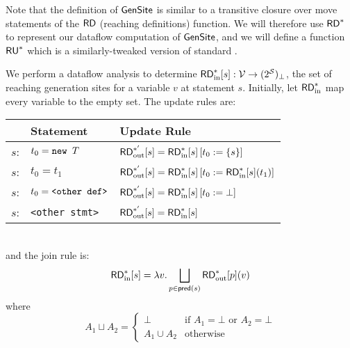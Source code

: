 \documentclass[11pt,notitlepage]{article}
\newcommand{\func}[1]{\ensuremath{\text{\sffamily #1}}}
\begin{document}
Note that the definition of $\func{GenSite}$ is similar to a
transitive closure over move statements of the $\func{RD}$ (reaching
definitions) function.  We will therefore use $\func{RD}^*$ to
represent our dataflow computation of $\func{GenSite}$, and we will
define a function $\func{RU}^*$ which is a similarly-tweaked version
of standard .

We perform a dataflow analysis to determine
$\func{RD}^*_\text{in}[s]:\mathcal{V}\to(2^\mathcal{S})_\bot$, the set
of reaching generation sites for a variable $v$ at statement $s$.
Initially, let $\func{RD}^*_\text{in}$ map every variable to the empty set.
The update rules are:
\\
\begin{tabular}{lll}
&\textbf{Statement}&\textbf{Update Rule}\\\hline
$s$: & $t_0=\text{\tt new }T$ & $\func{RD}^{*'}_\text{out}[s]=\func{RD}^*_\text{in}[s]\left[t_0:=\left\{s\right\}\right]$ \\
$s$: & $t_0=t_1$ & $\func{RD}^{*'}_\text{out}[s]=\func{RD}^*_\text{in}[s]\left[t_0:=\func{RD}^*_\text{in}[s](t_1)\right]$ \\
$s$: & $t_0=\text{\tt<other def>}$ & $\func{RD}^{*'}_\text{out}[s]=\func{RD}^*_\text{in}[s]\left[t_0:=\bot\right]$ \\
$s$: & \texttt{<other stmt>} &  $\func{RD}^{*'}_\text{out}[s]=\func{RD}^*_\text{in}[s]$ \\
\end{tabular}
\\
and the join rule is:
\begin{displaymath}
\func{RD}^*_\text{in}[s] = \lambda v. \bigsqcup_{p\in\func{pred}(s)} \func{RD}^*_\text{out}[p](v)
\end{displaymath}
where
\begin{displaymath}
A_1 \sqcup A_2 = \begin{cases}
\bot & \text{if } A_1=\bot \text{ or } A_2=\bot \\
A_1 \cup A_2 & \text{otherwise}
\end{cases}
\end{displaymath}
\end{document}
